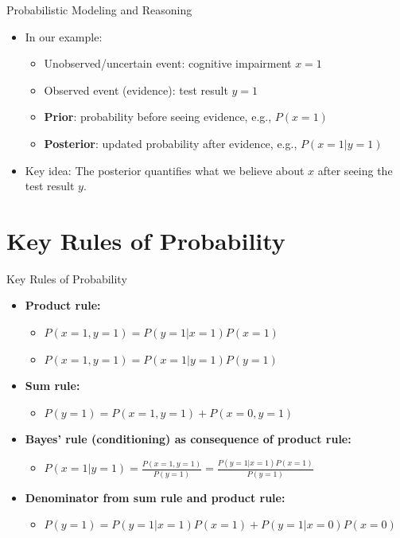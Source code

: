 \documentclass{beamer}
\begin{document}
\begin{frame}{Probabilistic Modeling and Reasoning}
\begin{itemize}
  \item In our example:
    \begin{itemize}
      \item Unobserved/uncertain event: cognitive impairment $x = 1$
      \item Observed event (evidence): test result $y = 1$
      \item \textbf{Prior}: probability before seeing evidence, e.g., $P(x = 1)$
      \item \textbf{Posterior}: updated probability after evidence, e.g., $P(x = 1 | y = 1)$
    \end{itemize}
  \item \alert{Key idea:} The posterior quantifies what we believe about $x$ after seeing the test result $y$.
\end{itemize}
\end{frame}

\section{Key Rules of Probability}

\begin{frame}{Key Rules of Probability}
\begin{itemize}
\item \textbf{Product rule:}
  \begin{itemize}
    \item $P(x = 1, y = 1) = P(y = 1|x = 1)P(x = 1)$
    \item $P(x = 1, y = 1) = P(x = 1|y = 1)P(y = 1)$
  \end{itemize}
\item \textbf{Sum rule:}
  \begin{itemize}
  \item $P(y = 1) = P(x = 1, y = 1) + P(x = 0, y = 1)$
  \end{itemize}
\item \textbf{Bayes' rule (conditioning) as consequence of product rule:}
  \begin{itemize}
    \item $P(x = 1|y = 1) = \frac{P(x = 1, y = 1)}{P(y = 1)} = \frac{P(y = 1|x = 1)P(x = 1)}{P(y = 1)}$
  \end{itemize}
\item \textbf{Denominator from sum rule and product rule:}
  \begin{itemize}
    \item $P(y = 1) = P(y = 1|x = 1)P(x = 1) + P(y = 1|x = 0)P(x = 0)$
    \end{itemize}
\end{itemize}
\end{frame}
\end{document}

